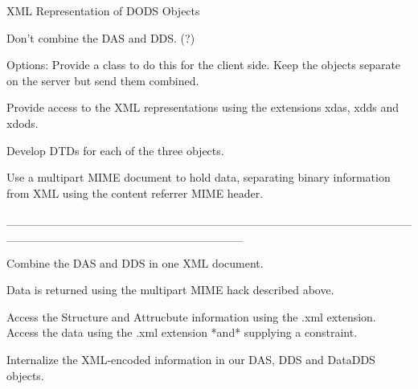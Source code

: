 XML Representation of DODS Objects

Don't combine the DAS and DDS. (?)

Options:
Provide a class to do this for the client side.
Keep the objects separate on the server but send them combined.

Provide access to the XML representations using the extensions xdas, xdds and
xdods.

Develop DTDs for each of the three objects.

Use a multipart MIME document to hold data, separating binary information
from XML using the content referrer MIME header.

____________________________________________________________________________

Combine the DAS and DDS in one XML document.

Data is returned using the multipart MIME hack described above.

Access the Structure and Attrucbute information using the .xml extension.
Access the data using the .xml extension *and* supplying a constraint.

Internalize the XML-encoded information in our DAS, DDS and DataDDS objects.

